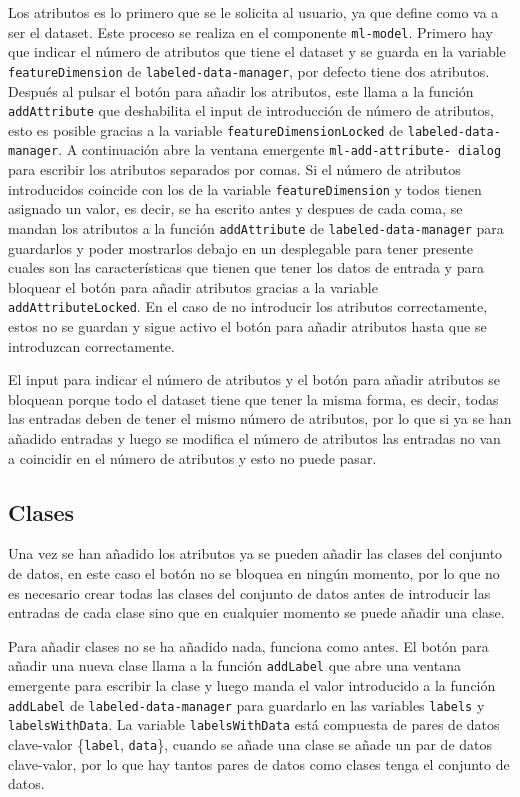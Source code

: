 \documentclass[a4paper, 12pt]{book}
\begin{document}
Los atributos es lo primero que se le solicita al usuario, ya que define como va a ser el dataset. Este proceso se realiza en el componente \texttt{ml-model}. Primero hay que indicar el número de atributos que tiene el dataset y se guarda en la variable \texttt{featureDimension} de \texttt{labeled-data-manager}, por defecto tiene dos atributos. Después al pulsar el botón para añadir los atributos, este llama a la función \texttt{addAttribute} que deshabilita el input de introducción de número de atributos, esto es posible gracias a la variable \texttt{featureDimensionLocked} de \texttt{labeled-data-manager}.
A continuación abre la ventana emergente \texttt{ml-add-attribute-
dialog} para escribir los atributos separados por comas. Si el número de atributos introducidos coincide con los de la variable \texttt{featureDimension} y todos tienen asignado un valor, es decir, se ha escrito antes y despues de cada coma, se mandan los atributos a la función \texttt{addAttribute} de \texttt{labeled-data-manager} para guardarlos y poder mostrarlos debajo en un desplegable para tener presente cuales son las características que tienen que tener los datos de entrada y para bloquear el botón para añadir atributos gracias a la variable \texttt{addAttributeLocked}. En el caso de no introducir los atributos correctamente, estos no se guardan y sigue activo el botón para añadir atributos hasta que se introduzcan correctamente.

El input para indicar el número de atributos y el botón para añadir atributos se bloquean porque todo el dataset tiene que tener la misma forma, es decir, todas las entradas deben de tener el mismo número de atributos, por lo que si ya se han añadido entradas y luego se modifica el número de atributos las entradas no van a coincidir en el número de atributos y esto no puede pasar.

\subsection{Clases}
\label{subsec:clases}

Una vez se han añadido los atributos ya se pueden añadir las clases del conjunto de datos, en este caso el botón no se bloquea en ningún momento, por lo que no es necesario crear todas las clases del conjunto de datos antes de introducir las entradas de cada clase sino que en cualquier momento se puede añadir una clase. 

Para añadir clases no se ha añadido nada, funciona como antes. El botón para añadir una nueva clase llama a la función \texttt{addLabel} que abre una ventana emergente para escribir la clase y luego manda el valor introducido a la función \texttt{addLabel} de \texttt{labeled-data-manager} para guardarlo en las variables \texttt{labels} y \texttt{labelsWithData}. La variable \texttt{labelsWithData} está compuesta de pares de datos clave-valor \{\texttt{label}, \texttt{data}\}, cuando se añade una clase se añade un par de datos clave-valor, por lo que hay tantos pares de datos como clases tenga el conjunto de datos.
\end{document}
